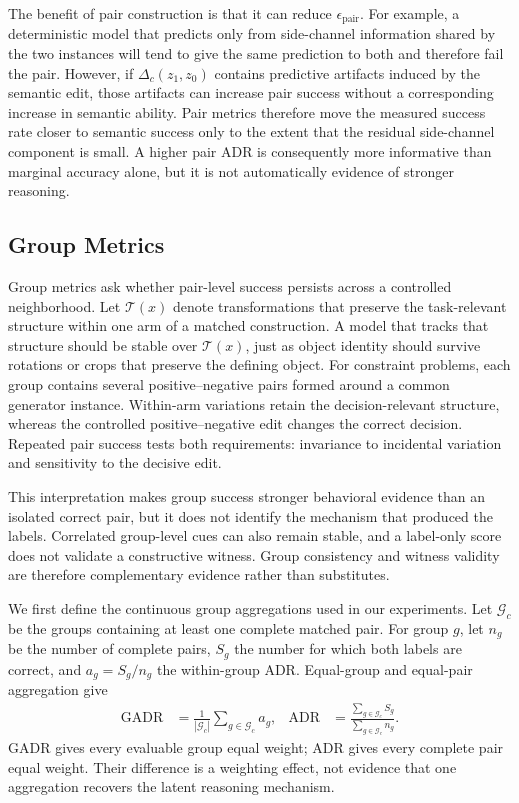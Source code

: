 \documentclass[acmsmall,screen,review,anonymous]{acmart}
\newcounter{experiment}
\begin{document}
The benefit of pair construction is that it can reduce
\(\epsilon_{\mathrm{pair}}\). For example, a deterministic model that
predicts only from side-channel information shared by the two instances will
tend to give the same prediction to both and therefore fail the pair.
However, if \(\Delta_c(z_1,z_0)\) contains predictive artifacts induced
by the semantic edit, those artifacts can increase pair success without a
corresponding increase in semantic ability. Pair metrics therefore move the
measured success rate closer to semantic success only to the extent that the
residual side-channel component is small. A higher pair ADR is consequently
more informative than marginal accuracy alone, but it is not automatically
evidence of stronger reasoning.

\subsection{Group Metrics}
\label{sec:controlled-metrics:group}

Group metrics ask whether pair-level success persists across a controlled
neighborhood. Let \(\mathcal{T}(x)\) denote transformations that preserve the
task-relevant structure within one arm of a matched construction. A model that
tracks that structure should be stable over \(\mathcal{T}(x)\), just as object
identity should survive rotations or crops that preserve the defining object.
For constraint problems, each group contains several positive--negative pairs
formed around a common generator instance. Within-arm variations retain the
decision-relevant structure, whereas the controlled positive--negative edit
changes the correct decision. Repeated pair success tests both requirements:
invariance to incidental variation and sensitivity to the decisive edit.

This interpretation makes group success stronger behavioral evidence than an
isolated correct pair, but it does not identify the mechanism that produced
the labels. Correlated group-level cues can also remain stable, and a
label-only score does not validate a constructive witness. Group consistency
and witness validity are therefore complementary evidence rather than
substitutes.

We first define the continuous group aggregations used in our experiments.
Let \(\mathcal{G}_{c}\) be the groups containing at least one complete matched
pair. For group \(g\), let \(n_g\) be the number of complete pairs,
\(S_g\) the number for which both labels are correct, and
\(a_g=S_g/n_g\) the within-group ADR. Equal-group and equal-pair aggregation
give
\begin{align}
\mathrm{GADR}
&=
\frac{1}{|\mathcal{G}_{c}|}
\sum_{g\in\mathcal{G}_{c}} a_g,
&
\mathrm{ADR}
&=
\frac{\sum_{g\in\mathcal{G}_{c}}S_g}
     {\sum_{g\in\mathcal{G}_{c}}n_g}.
\label{eq:group-adr-macro-micro}
\end{align}
GADR gives every evaluable group equal weight; ADR gives every complete pair
equal weight. Their difference is a weighting effect, not evidence that one
aggregation recovers the latent reasoning mechanism.
\end{document}

